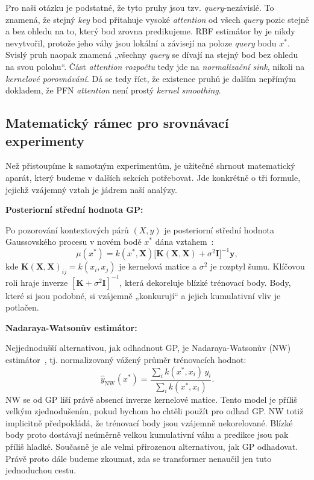 Pro naši otázku je podstatné, že tyto pruhy jsou tzv. \textit{query}-nezávislé.
To znamená, že stejný \textit{key} bod přitahuje vysoké \emph{attention} od všech \emph{query} pozic stejně a bez ohledu na to, který bod zrovna predikujeme.
RBF estimátor by je nikdy nevytvořil, protože jeho váhy jsou lokální a závisejí na poloze \emph{query} bodu $x^*$.
Svislý pruh naopak znamená „všechny \emph{query} se dívají na stejný bod bez ohledu na svou polohu“.
Část \emph{attention rozpočtu} tedy jde na \emph{normalizační sink}, nikoli na \emph{kernelové porovnávání}.
Dá se tedy říct, že existence pruhů je dalším nepřímým dokladem, že PFN \emph{attention} není prostý \emph{kernel smoothing}.

\subsection{Matematický rámec pro srovnávací experimenty}
\label{subsec:matematicky-ramec}

Než přistoupíme k samotným experimentům, je užitečné shrnout matematický aparát, který budeme v dalších sekcích potřebovat.
Jde konkrétně o tři formule, jejichž vzájemný vztah je jádrem naší analýzy.

\textbf{Posteriorní střední hodnota GP:}

Po pozorování kontextových párů $(X, y)$ je posteriorní střední hodnota Gaussovského procesu v novém bodě $x^*$ dána vztahem~\cite{rasmussen2006}:
$$\mu(x^*) = k(x^*, \mathbf{X})\bigl[\mathbf{K}(\mathbf{X},\mathbf{X}) + \sigma^2 \mathbf{I}\bigr]^{-1} \mathbf{y},$$
kde $\mathbf{K}(\mathbf{X},\mathbf{X})_{ij} = k(x_i, x_j)$ je kernelová matice a $\sigma^2$ je rozptyl šumu.
Klíčovou roli hraje inverze $[\mathbf{K} + \sigma^2 \mathbf{I}]^{-1}$, která dekoreluje blízké trénovací body.
Body, které si jsou podobné, si vzájemně „konkurují“ a jejich kumulativní vliv je potlačen.

\textbf{Nadaraya-Watsonův estimátor:}

Nejjednodušší alternativou, jak odhadnout GP, je Nadaraya-Watsonův (NW) estimátor~\cite{bishop2006}, tj. normalizovaný vážený průměr trénovacích hodnot:
$$\hat{y}_{\text{NW}}(x^*) = \frac{\displaystyle\sum_i k(x^*, x_i)\, y_i}{\displaystyle\sum_i k(x^*, x_i)}.$$
NW se od GP liší právě absencí inverze kernelové matice.
Tento model je příliš velkým zjednodušením, pokud bychom ho chtěli použít pro odhad GP.
NW totiž implicitně předpokládá, že trénovací body jsou vzájemně nekorelované.
Blízké body proto dostávají neúměrně velkou kumulativní váhu a predikce jsou pak příliš hladké.
Současně je ale velmi přirozenou alternativou, jak GP odhadovat.
Právě proto dále budeme zkoumat, zda se transformer nenaučil jen tuto jednoduchou cestu.

